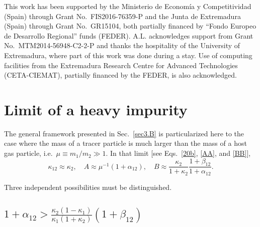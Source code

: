 \documentclass[aps,pre,reprint]{revtex4-1}
\newcommand\beq{\begin{equation}}
\newcommand\eeq{\end{equation}}
\begin{document}
\begin{acknowledgments}
This work has been supported by the
Ministerio de Econom\'ia y Competitividad (Spain) through Grant No.\
FIS2016-76359-P and  the Junta de Extremadura (Spain) through Grant
No.\ GR15104, both partially financed by ``Fondo Europeo de Desarrollo
Regional'' funds (FEDER). A.L.
acknowledges support from  Grant No.\
MTM2014-56948-C2-2-P and thanks the hospitality of the University of Extremadura, where  part of this work was done during a
stay. Use of computing facilities from the Extremadura Research
Centre for Advanced Technologies (CETA-CIEMAT), partially financed by the FEDER, is
also acknowledged.
\end{acknowledgments}

\appendix*
\section{Limit of a heavy impurity}
The general framework presented in Sec.\ \ref{sec3.B} is particularized here to  the case where the mass of a tracer particle is much larger than the mass of a host gas particle, i.e.\, $\mu\equiv m_1/m_2\gg 1$. In that limit [see Eqs.\ \eqref{20b}, \eqref{AA}, and \eqref{BB}],
\beq
\kappa_{12}\approx \kappa_2,\quad A\approx\mu^{-1}(1+\alpha_{12}),\quad  B\approx \frac{\kappa_{2}}{1+\kappa_{2}}\frac{1+\beta_{12}}{1+\alpha_{12}}.
\eeq

Three independent possibilities must be distinguished.

\subsection{$\displaystyle{1+\alpha_{12}>\frac{\kappa_2(1-\kappa_1)}{\kappa_1(1+\kappa_2)}(1+\beta_{12})}$}
\label{subsecA1}
\end{document}
